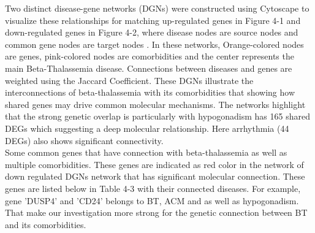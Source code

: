 
Two distinct disease-gene networks (DGNs) were constructed using Cytoscape to visualize these relationships for matching up-regulated genes in Figure 4-1 and down-regulated genes in Figure 4-2, where disease nodes are source nodes and common gene nodes are target nodes \cite{b5}. In these networks, Orange-colored nodes are genes, pink-colored nodes are comorbidities and the center represents the main Beta-Thalassemia disease. Connections between diseases and genes are weighted using the Jaccard Coefficient. These DGNs illustrate the interconnections of beta-thalassemia with its comorbidities that showing how shared genes may drive common molecular mechanisms. The networks highlight that the strong genetic overlap is particularly with hypogonadism has 165 shared DEGs which suggesting a deep molecular relationship. Here arrhythmia (44 DEGs) also shows significant connectivity.\\

Some common genes that have connection with beta-thalassemia as well as multiple comorbidities. These genes are indicated as red color in the network of down regulated DGNs network that has significant molecular connection. These genes are listed below in Table 4-3 with their connected diseases. For example, gene 'DUSP4' and 'CD24' belongs to BT, ACM and as well as hypogonadism. That make our investigation more strong for the genetic connection between BT and its comorbidities.\\ 


